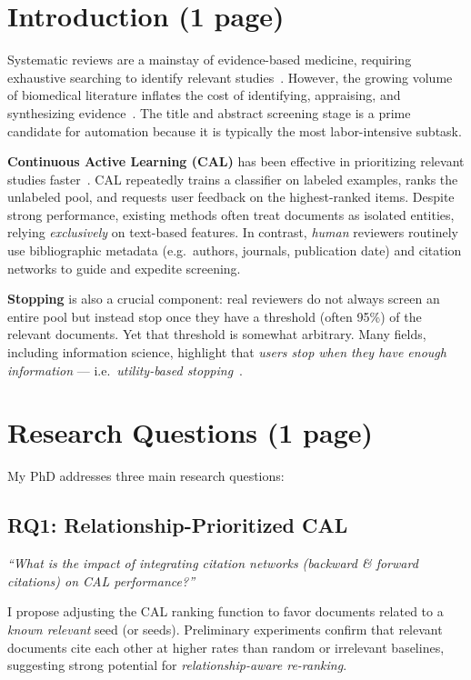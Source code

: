 \documentclass[11pt,a4paper]{article}
\begin{document}
\section{Introduction (1 page)}
Systematic reviews are a mainstay of evidence-based medicine, requiring exhaustive searching to identify relevant studies~\cite{ioannidis_mass_2016}. However, the growing volume of biomedical literature inflates the cost of identifying, appraising, and synthesizing evidence~\cite{ghasemi_scientific_2022}. The title and abstract screening stage is a prime candidate for automation because it is typically the most labor-intensive subtask.

\textbf{Continuous Active Learning (CAL)} has been effective in prioritizing relevant studies faster~\cite{cormack_engineering_2016}. CAL repeatedly trains a classifier on labeled examples, ranks the unlabeled pool, and requests user feedback on the highest-ranked items. Despite strong performance, existing methods often treat documents as isolated entities, relying \emph{exclusively} on text-based features. In contrast, \emph{human} reviewers routinely use bibliographic metadata (e.g.\ authors, journals, publication date) and citation networks to guide and expedite screening. 

\textbf{Stopping} is also a crucial component: real reviewers do not always screen an entire pool but instead stop once they have a threshold (often 95\%) of the relevant documents. Yet that threshold is somewhat arbitrary. Many fields, including information science, highlight that \emph{users stop when they have enough information} --- i.e.\ \emph{utility-based stopping}~\cite{ilani_analysis_2024}.

\section{Research Questions (1 page)}
My PhD addresses three main research questions:

\subsection{RQ1: Relationship-Prioritized CAL}
\emph{``What is the impact of integrating citation networks (backward \& forward citations) on CAL performance?''}

I propose adjusting the CAL ranking function to favor documents related to a \emph{known relevant} seed (or seeds). Preliminary experiments confirm that relevant documents cite each other at higher rates than random or irrelevant baselines, suggesting strong potential for \emph{relationship-aware re-ranking}.
\end{document}
